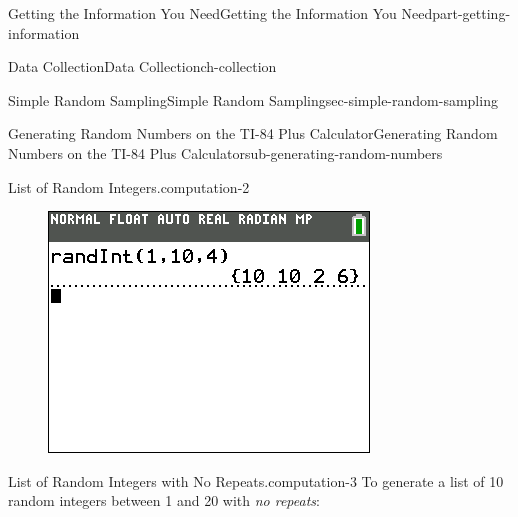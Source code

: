 \documentclass[oneside,10pt,]{book}
\newcommand{\mono}[1]{\texttt{#1}}
\numberwithin{equation}{section}
\newenvironment{codedisplay}
{\VerbatimEnvironment\begin{center}\begin{lrbox}{\codedisplaybox}\begin{BVerbatim}}
{\end{BVerbatim}\end{lrbox}\usebox{\codedisplaybox}\end{center}}
\begin{document}
\begin{partptx}{Getting the Information You Need}{}{Getting the Information You Need}{}{}{part-getting-information}
\begin{chapterptx}{Data Collection}{}{Data Collection}{}{}{ch-collection}
\begin{sectionptx}{Simple Random Sampling}{}{Simple Random Sampling}{}{}{sec-simple-random-sampling}
\begin{subsectionptx}{Generating Random Numbers on the TI-84 Plus Calculator}{}{Generating Random Numbers on the TI-84 Plus Calculator}{}{}{sub-generating-random-numbers}
\begin{computation}{List of Random Integers.}{computation-2}
%
\begin{figure}\centering\includegraphics[width=0.4\linewidth]{images/randInt-list.png}
\end{figure}\end{computation}
\begin{computation}{List of Random Integers with No Repeats.}{computation-3}%
\hypertarget{p-12}{}%
To generate a list of 10 random integers between 1 and 20 with \emph{no repeats}:\leavevmode%
\end{computation}
\end{subsectionptx}
\end{sectionptx}
\end{chapterptx}
\end{partptx}
\end{document}
